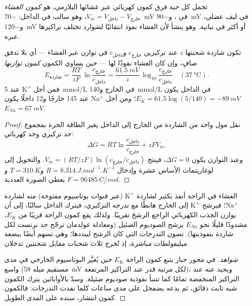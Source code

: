\begin{definition}\label{def:b1:membranes-transport:potential}
تحمل كل  حية فرق كمون كهربائي عبر غشائها البلازمي، هو \emph{كمون
الغشاء} $V_m = V_{\text{داخل}} - V_{\text{خارج}}$،
وهو سالب في الداخل: \qty{-70}{mV} في ، و\qty{-90}{mV} في ليف
عضلي، و\qty{-120}{mV} أو أكثر في  نباتية. وهو ينشأ لأن الغشاء
نفوذ انتقائيًا لشوارد تختلف تراكيزها عبره.
\end{definition}

\begin{theorem}\label{thm:b1:membranes-transport:nernst}
تكون شاردة شحنتها $z$ عند تركيزين $c_{\text{خارج}}$ و$c_{\text{داخل}}$
في توازن عبر الغشاء --- أي بلا تدفق صافٍ، وإن كان الغشاء نفوذًا لها
--- حين يساوي الكمون \emph{كمون توازنها}
\[
E_{\text{شاردة}} = \frac{RT}{zF}\,\ln\frac{c_{\text{خارج}}}{c_{\text{داخل}}}
= \frac{\qty{61.5}{mV}}{z}\,\log_{10}\frac{c_{\text{خارج}}}{c_{\text{داخل}}}
\quad (\qty{37}{\celsius}).
\]
فمن أجل $\mathrm{K^+}$ عند \qty{5}{mmol/L} في الخارج
و\qty{140}{mmol/L} في الداخل يكون
$E_K = 61.5\log(5/140) = \qty{-89}{mV}$؛ ومن أجل $\mathrm{Na^+}$ عند
\qty{145}{} خارجًا و\qty{12}{} داخلًا يكون $E_{Na} = \qty{+67}{mV}$.
\end{theorem}
\begin{proof}
نقل مول واحد من الشاردة من الخارج إلى الداخل يغير الطاقة الحرة بمجموع
حد تركيزي وحد كهربائي:
\[
\Delta G = RT\ln\frac{c_{\text{داخل}}}{c_{\text{خارج}}} + zFV_m .
\]
وعند التوازن يكون $\Delta G = 0$، فينتج $V_m = (RT/zF)\ln(c_{\text{خارج}}/c_{\text{داخل}})$.
والتحويل إلى لوغاريتمات الأساس عشرة وإدخال $R = \qty{8.314}{J.mol^{-1}.K^{-1}}$
و$T = \qty{310}{K}$ و$F = \qty{96485}{C/mol}$ يعطي الصورة العددية.
\end{proof}

\begin{proposition}\label{prop:b1:membranes-transport:resting}
الغشاء في الراحة أنفذ بكثير لشاردة $\mathrm{K^+}$ (عبر قنوات بوتاسيوم
مفتوحة) منه لشاردة $\mathrm{Na^+}$؛ فيرشح $\mathrm{K^+}$ إلى الخارج هابطًا
مع تدرجه التركيزي، فيترك الداخل سالبًا، إلى أن يوازن الجذب الكهربائي
الراجع الرشحَ تقريبًا. ولذلك يقع كمون الراحة قريبًا من $E_K$، مشدودًا
قليلًا نحو $E_{Na}$ برشح الصوديوم الضئيل (ومعادلة غولدمان ترجّح حد
نرنست لكل شاردة بنفوذيتها).  تصون التدرجات التي كان الرشح
ليبددها؛ وهي تسهم أيضًا ببضعة ميليفولطات مباشرة، إذ تُخرج ثلاث شحنات
مقابل شحنتين تدخلان.
\end{proposition}
\begin{proof}[شواهد]
في محور حبار يتبع كمون الراحة $E_K$ حين يُغيَّر البوتاسيوم الخارجي في
مدى واسع (مستقيم ميله \qty{58}{mV} لكل مرتبة قدر عند التراكيز
المرتفعة)، ويحيد عنه عند التراكيز المنخفضة تمامًا كما تتنبأ نفوذية
صوديوم ضئيلة. وسدّ  بالأوابائين يترك الكمون شبه ثابت دقائق، ثم
يدعه يضمحل على مدى ساعات كلما نفدت التدرجات: فالكمون كمون انتشار،
 سنده على المدى الطويل.
\end{proof}

